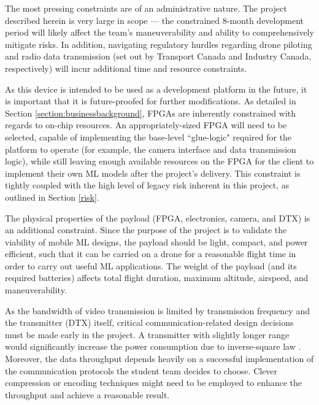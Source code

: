 The most pressing constraints are of an administrative nature. The project described
herein is very large in scope --- the constrained 8-month development period 
will likely affect the team's maneuverability and ability to comprehensively mitigate risks. 
In addition, navigating regulatory hurdles regarding drone piloting and radio data transmission (set out by 
Transport Canada and Industry Canada, respectively) will incur additional time and resource constraints.

As this device is intended to be used as a development platform in the future, it is important that it is future-proofed for further modifications. As detailed in Section \ref{section:businessbackground}, FPGAs are
inherently constrained with regards to on-chip resources. An appropriately-sized FPGA will need to be selected, capable of
implementing the base-level ``glue-logic" required for the platform to operate (for example, the camera interface and data transmission logic), while still
leaving enough available resources on the FPGA for the client to implement their own ML models after the project's delivery. 
This constraint is tightly coupled with the high level of legacy risk inherent in this project, as outlined in Section \ref{risk}.

The physical properties of the payload (FPGA, electronics, camera, and  DTX) is an additional constraint. Since the purpose of the project
is to validate the viability of mobile ML designs, the payload should be light, compact, and power efficient, such
that it can be carried on a drone for a reasonable flight time in order to carry out useful ML applications.
The weight of the payload (and its required batteries) affects total flight duration, maximum altitude, airspeed, and maneuverability. 

As the bandwidth of video transmission is limited by transmission frequency and the transmitter (DTX) itself, 
critical communication-related design decisions must be made early in the project.
A transmitter with slightly longer range would significantly increase the power consumption due to inverse-square law \cite{wiki-inverse-square}.
Moreover, the data throughput depends heavily on a successful implementation of the communication
protocols the student team decides to choose. Clever compression or encoding techniques might need to be
employed to enhance the throughput and achieve a reasonable result.

